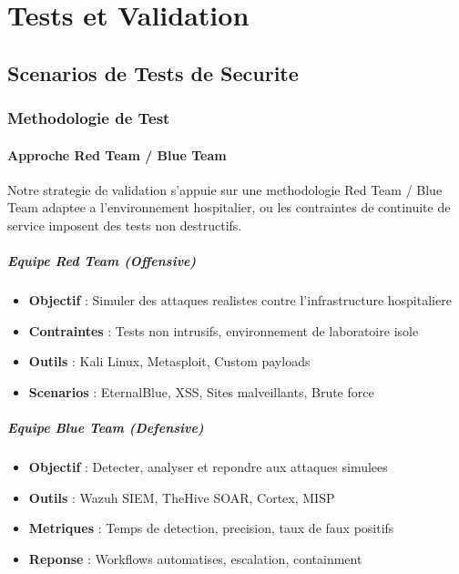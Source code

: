 \chapter{Tests et Validation}

\section{Scenarios de Tests de Securite}

\subsection{Methodologie de Test}

\subsubsection{Approche Red Team / Blue Team}

Notre strategie de validation s'appuie sur une methodologie Red Team / Blue Team adaptee a l'environnement hospitalier, ou les contraintes de continuite de service imposent des tests non destructifs.

\paragraph{Equipe Red Team (Offensive)}
\begin{itemize}
    \item \textbf{Objectif} : Simuler des attaques realistes contre l'infrastructure hospitaliere
    \item \textbf{Contraintes} : Tests non intrusifs, environnement de laboratoire isole
    \item \textbf{Outils} : Kali Linux, Metasploit, Custom payloads
    \item \textbf{Scenarios} : EternalBlue, XSS, Sites malveillants, Brute force
\end{itemize}

\paragraph{Equipe Blue Team (Defensive)}
\begin{itemize}
    \item \textbf{Objectif} : Detecter, analyser et repondre aux attaques simulees
    \item \textbf{Outils} : Wazuh SIEM, TheHive SOAR, Cortex, MISP
    \item \textbf{Metriques} : Temps de detection, precision, taux de faux positifs
    \item \textbf{Reponse} : Workflows automatises, escalation, containment
\end{itemize}

